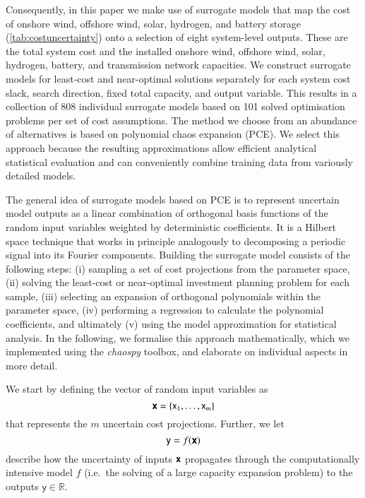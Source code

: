 
Consequently, in this paper we make use of surrogate models that map the cost of
onshore wind, offshore wind, solar, hydrogen, and battery storage
(\cref{tab:costuncertainty}) onto a selection of eight system-level outputs.
These are the total system cost and the installed onshore wind, offshore wind,
solar, hydrogen, battery, and transmission network capacities. We construct
surrogate models for least-cost and near-optimal solutions separately for each
system cost slack, search direction, fixed total capacity, and output variable.
This results in a collection of 808 individual surrogate models based on 101
solved optimisation problems per set of cost assumptions. The method we choose
from an abundance of alternatives is based on polynomial chaos expansion (PCE).
\cite{sudret_global_2008,fajraoui_optimal_2017,gratiet_metamodel-based_2015} We
select this approach because the resulting approximations allow efficient
analytical statistical evaluation\cite{sudret_global_2008} and can conveniently
combine training data from variously detailed
models.\cite{palar_multi-fidelity_2016}


The general idea of surrogate models based on PCE is to represent uncertain
model outputs as a linear combination of orthogonal basis functions of the
random input variables weighted by deterministic
coefficients.\cite{muhlpfordt_uncertainty_2020} It is a Hilbert space technique
that works in principle analogously to decomposing a periodic signal into its
Fourier components.\cite{muhlpfordt_uncertainty_2020} Building the surrogate
model consists of the following steps: (i) sampling a set of cost projections
from the parameter space, (ii) solving the least-cost or near-optimal investment
planning problem for each sample, (iii) selecting an expansion of orthogonal
polynomials within the parameter space, (iv) performing a regression to
calculate the polynomial coefficients, and ultimately (v) using the model
approximation for statistical analysis. In the following, we formalise this
approach mathematically, which we implemented using the \textit{chaospy}
toolbox,\cite{feinberg_chaospy_2015} and elaborate on individual aspects in more
detail.

We start by defining the vector of random input variables as
\begin{equation}
    \boldsymbol{\mathsf{x}} = \{\mathsf{x}_1, \dots , \mathsf{x}_m\}
\end{equation}
that represents the $m$ uncertain cost projections. Further, we let
\begin{equation}
    \mathsf{y} = f(\boldsymbol{\mathsf{x}})
\end{equation}
describe how the uncertainty of inputs $\boldsymbol{\mathsf{x}}$ propagates through the
computationally intensive model $f$ (i.e.~the solving of a large capacity
expansion problem) to the outputs $\mathsf{y} \in \mathbb{R}$.

